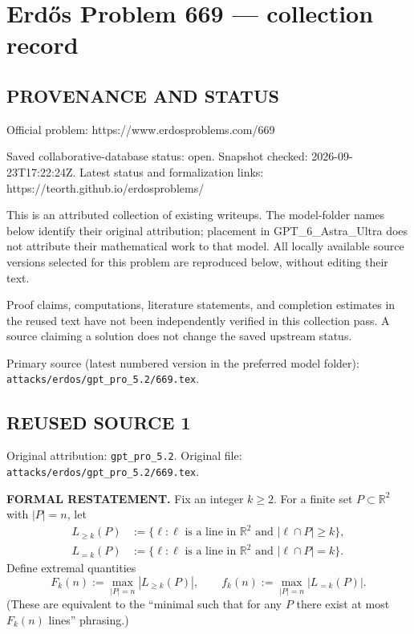 \section*{Erd\H{o}s Problem 669 --- collection record}

\subsection*{PROVENANCE AND STATUS}
Official problem: https://www.erdosproblems.com/669

Saved collaborative-database status: open.
Snapshot checked: 2026-09-23T17:22:24Z.
Latest status and formalization links: https://teorth.github.io/erdosproblems/

This is an attributed collection of existing writeups. The model-folder names below identify their original attribution; placement in GPT\_6\_Astra\_Ultra does not attribute their mathematical work to that model. All locally available source versions selected for this problem are reproduced below, without editing their text.

Proof claims, computations, literature statements, and completion estimates in the reused text have not been independently verified in this collection pass. A source claiming a solution does not change the saved upstream status.

Primary source (latest numbered version in the preferred model folder): \texttt{attacks/erdos/gpt\_pro\_5.2/669.tex}.

\subsection*{REUSED SOURCE 1}
Original attribution: \texttt{gpt\_pro\_5.2}.
Original file: \texttt{attacks/erdos/gpt\_pro\_5.2/669.tex}.



\noindent\textbf{FORMAL RESTATEMENT.}
Fix an integer $k\ge 2$.
For a finite set $P\subset\mathbb{R}^2$ with $|P|=n$, let
\begin{align*}
L_{\ge k}(P) &:= \{ \ell : \ell \text{ is a line in }\mathbb{R}^2 \text{ and } |\ell\cap P|\ge k\},\\
L_{=k}(P) &:= \{ \ell : \ell \text{ is a line in }\mathbb{R}^2 \text{ and } |\ell\cap P|= k\}.
\end{align*}
Define extremal quantities
\[
F_k(n) := \max_{|P|=n} |L_{\ge k}(P)|,
\qquad
f_k(n) := \max_{|P|=n} |L_{=k}(P)|.
\]
(These are equivalent to the ``minimal such that for any $P$ there exist at most $F_k(n)$ lines'' phrasing.)

